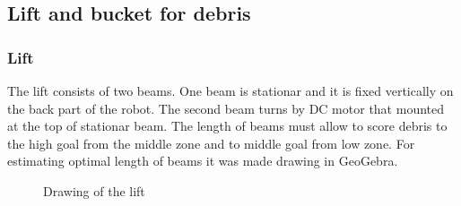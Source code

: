 \subsection{Lift and bucket for debris}

\subsubsection{Lift}
The lift consists of two beams. One beam is stationar and it is fixed vertically on the back part of the robot. The second beam turns by DC motor that mounted at the top of stationar beam. The length of beams must allow to score debris to the high goal from the middle zone and to middle goal from low zone.	\newline
For estimating optimal length of beams it was made drawing in GeoGebra.
\begin{figure}[H]
	\begin{minipage}[h]{1\linewidth}
		\caption{Drawing of the lift}
	\end{minipage}
\end{figure}

